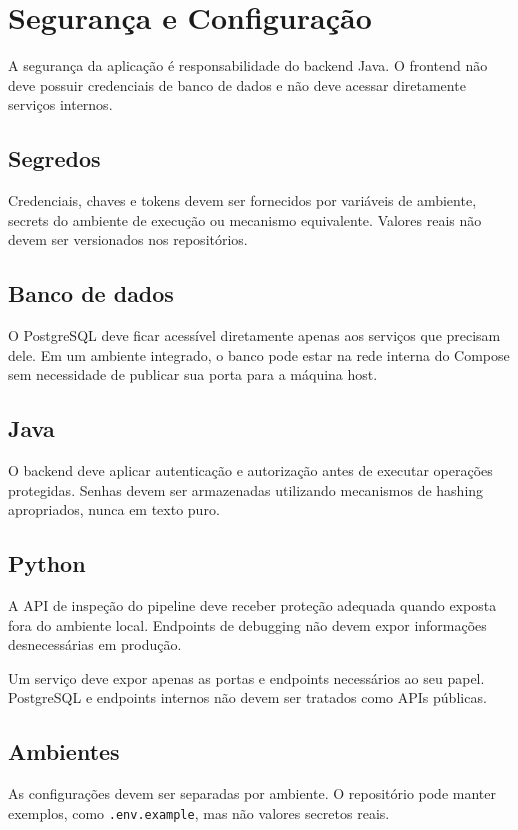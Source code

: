 \section{Segurança e Configuração}

A segurança da aplicação é responsabilidade do backend Java. O frontend não deve possuir credenciais de banco de dados e não deve acessar diretamente serviços internos.

\subsection{Segredos}

Credenciais, chaves e tokens devem ser fornecidos por variáveis de ambiente, secrets do ambiente de execução ou mecanismo equivalente. Valores reais não devem ser versionados nos repositórios.

\subsection{Banco de dados}

O PostgreSQL deve ficar acessível diretamente apenas aos serviços que precisam dele. Em um ambiente integrado, o banco pode estar na rede interna do Compose sem necessidade de publicar sua porta para a máquina host.

\subsection{Java}

O backend deve aplicar autenticação e autorização antes de executar operações protegidas. Senhas devem ser armazenadas utilizando mecanismos de hashing apropriados, nunca em texto puro.

\subsection{Python}

A API de inspeção do pipeline deve receber proteção adequada quando exposta fora do ambiente local. Endpoints de debugging não devem expor informações desnecessárias em produção.

\begin{regra}
Um serviço deve expor apenas as portas e endpoints necessários ao seu papel. PostgreSQL e endpoints internos não devem ser tratados como APIs públicas.
\end{regra}

\subsection{Ambientes}

As configurações devem ser separadas por ambiente. O repositório pode manter exemplos, como \texttt{.env.example}, mas não valores secretos reais.
